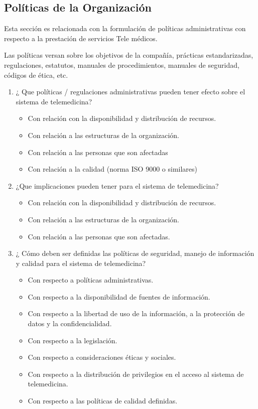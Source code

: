 \subsection{Políticas de la Organización}

Esta sección es relacionada con la formulación de políticas administrativas con respecto a la prestación de servicios Tele médicos.

Las políticas versan sobre los objetivos de la compañía, prácticas estandarizadas, regulaciones, estatutos, manuales de procedimientos, manuales de seguridad, códigos de ética, etc.

\begin{enumerate}
\item ¿ Que políticas / regulaciones administrativas pueden tener efecto sobre el sistema de telemedicina?

\begin{itemize}
\item Con relación con la disponibilidad y distribución de recursos.
\item Con relación a las estructuras de la organización.
\item Con relación a las personas que son afectadas
\item Con relación a la calidad (norma ISO 9000 o similares)                                                      \end{itemize}

\item ¿Que implicaciones pueden tener para el sistema de telemedicina?

\begin{itemize}
\item Con relación con la disponibilidad y distribución de recursos.
\item Con relación a las estructuras de la organización.
\item Con relación a las personas que son afectadas.
\end{itemize}

\item ¿ Cómo deben ser definidas las políticas de seguridad, manejo de información y calidad para el sistema de telemedicina?

\begin{itemize}
\item Con respecto a políticas administrativas.
\item Con respecto a la disponibilidad de fuentes de información.
\item Con respecto a la libertad de uso de la información, a la protección de datos y la confidencialidad.
\item Con respecto a la legislación.
\item Con respecto a consideraciones éticas y sociales.
\item Con respecto a la distribución de privilegios en el acceso al sistema de telemedicina. 
\item Con respecto a las políticas de calidad definidas.
\end{itemize}

\end{enumerate}

